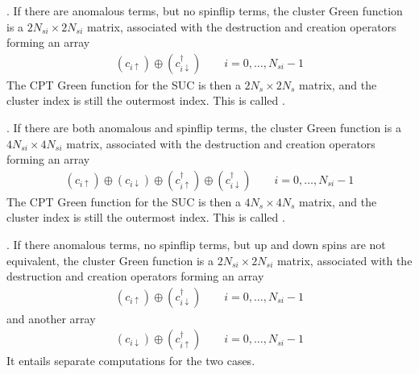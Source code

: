 \documentclass[letterpaper,10pt,english]{sphinxmanual}
\begin{document}
\sphinxAtStartPar
{}. If there are anomalous terms, but no spin\sphinxhyphen{}flip terms, the cluster Green function is a \(2N_{si}\times 2N_{si}\) matrix, associated with the destruction and creation operators forming an array
\begin{equation*}
\begin{split}(c_{i\uparrow})\oplus(c^\dagger_{i\downarrow}) \qquad i=0,\dots,N_{si}-1\end{split}
\end{equation*}
\sphinxAtStartPar
The CPT Green function for the SUC is then a \(2N_s\times 2N_s\) matrix, and the cluster index is still the outermost index. This is called .

\sphinxAtStartPar
{}. If there are both anomalous and spin\sphinxhyphen{}flip terms, the cluster Green function is a \(4N_{si}\times 4N_{si}\) matrix, associated with the destruction and creation operators forming an array
\begin{equation*}
\begin{split}(c_{i\uparrow})\oplus(c_{i\downarrow})\oplus(c^\dagger_{i\uparrow})\oplus(c^\dagger_{i\downarrow})\qquad i=0,\dots,N_{si}-1\end{split}
\end{equation*}
\sphinxAtStartPar
The CPT Green function for the SUC is then a \(4N_s\times 4N_s\) matrix, and the cluster index is still the outermost index. This is called .

\sphinxAtStartPar
{}. If there anomalous terms, no spin\sphinxhyphen{}flip terms, but up and down spins are not equivalent, the cluster Green function is a  \(2N_{si}\times 2N_{si}\) matrix, associated with the destruction and creation operators forming an array
\begin{equation*}
\begin{split}(c_{i\uparrow})\oplus(c^\dagger_{i\downarrow}) \qquad i=0,\dots,N_{si}-1\end{split}
\end{equation*}
\sphinxAtStartPar
and another array
\begin{equation*}
\begin{split}(c_{i\downarrow})\oplus(c^\dagger_{i\uparrow}) \qquad i=0,\dots,N_{si}-1\end{split}
\end{equation*}
\sphinxAtStartPar
It entails separate computations for the two cases.
\end{document}
